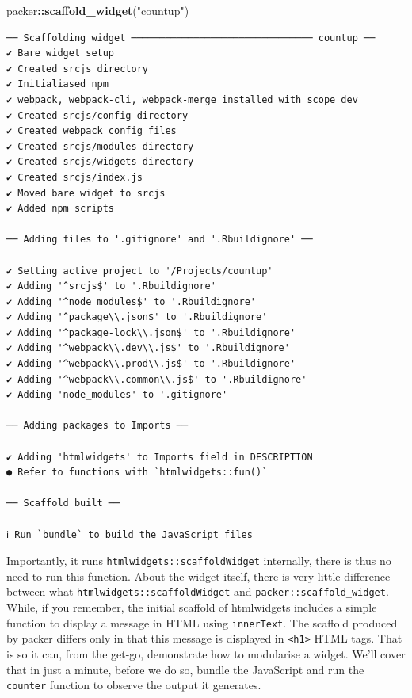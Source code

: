 \documentclass[10pt,]{krantz}
\makeatletter
\newenvironment{Shaded}{\begin{snugshade}}{\end{snugshade}}
\newcommand{\KeywordTok}[1]{\textcolor[rgb]{0.27,0.27,0.27}{\textbf{#1}}}
\newcommand{\NormalTok}[1]{#1}
\newcommand{\OperatorTok}[1]{\textcolor[rgb]{0.43,0.43,0.43}{\textbf{#1}}}
\newcommand{\StringTok}[1]{\textcolor[rgb]{0.5,0.5,0.5}{#1}}
\newenvironment{kframe}{%
\medskip{}
\setlength{\fboxsep}{.8em}
 \def\at@end@of@kframe{}%
 \ifinner\ifhmode%
  \def\at@end@of@kframe{\end{minipage}}%
  \begin{minipage}{\columnwidth}%
 \fi\fi%
 \def\FrameCommand##1{\hskip\@totalleftmargin \hskip-\fboxsep
 \colorbox{shadecolor}{##1}\hskip-\fboxsep
     \hskip-\linewidth \hskip-\@totalleftmargin \hskip\columnwidth}%
 \MakeFramed {\advance\hsize-\width
   \@totalleftmargin\z@ \linewidth\hsize
   \@setminipage}}%
 {\par\unskip\endMakeFramed%
 \at@end@of@kframe}
\renewenvironment{Shaded}{\begin{kframe}}{\end{kframe}}
\makeatother
\begin{document}
\begin{Shaded}
\begin{Highlighting}[]
\NormalTok{packer}\OperatorTok{::}\KeywordTok{scaffold_widget}\NormalTok{(}\StringTok{"countup"}\NormalTok{)}
\end{Highlighting}
\end{Shaded}

\begin{verbatim}
── Scaffolding widget ──────────────────────────────── countup ── 
✔ Bare widget setup
✔ Created srcjs directory
✔ Initialiased npm
✔ webpack, webpack-cli, webpack-merge installed with scope dev
✔ Created srcjs/config directory
✔ Created webpack config files
✔ Created srcjs/modules directory
✔ Created srcjs/widgets directory
✔ Created srcjs/index.js
✔ Moved bare widget to srcjs
✔ Added npm scripts

── Adding files to '.gitignore' and '.Rbuildignore' ──

✔ Setting active project to '/Projects/countup'
✔ Adding '^srcjs$' to '.Rbuildignore'
✔ Adding '^node_modules$' to '.Rbuildignore'
✔ Adding '^package\\.json$' to '.Rbuildignore'
✔ Adding '^package-lock\\.json$' to '.Rbuildignore'
✔ Adding '^webpack\\.dev\\.js$' to '.Rbuildignore'
✔ Adding '^webpack\\.prod\\.js$' to '.Rbuildignore'
✔ Adding '^webpack\\.common\\.js$' to '.Rbuildignore'
✔ Adding 'node_modules' to '.gitignore'

── Adding packages to Imports ──

✔ Adding 'htmlwidgets' to Imports field in DESCRIPTION
● Refer to functions with `htmlwidgets::fun()`

── Scaffold built ──

ℹ Run `bundle` to build the JavaScript files
\end{verbatim}

Importantly, it runs \texttt{htmlwidgets::scaffoldWidget} internally, there is thus no need to run this function. About the widget itself, there is very little difference between what \texttt{htmlwidgets::scaffoldWidget} and \texttt{packer::scaffold\_widget}. While, if you remember, the initial scaffold of htmlwidgets includes a simple function to display a message in HTML using \texttt{innerText}. The scaffold produced by packer differs only in that this message is displayed in \texttt{\textless{}h1\textgreater{}} HTML tags. That is so it can, from the get-go, demonstrate how to modularise a widget. We'll cover that in just a minute, before we do so, bundle the JavaScript and run the \texttt{counter} function to observe the output it generates.
\end{document}
